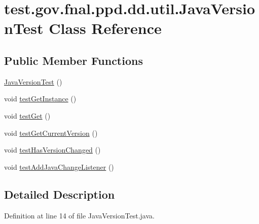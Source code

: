 \hypertarget{classtest_1_1gov_1_1fnal_1_1ppd_1_1dd_1_1util_1_1JavaVersionTest}{\section{test.\-gov.\-fnal.\-ppd.\-dd.\-util.\-Java\-Version\-Test Class Reference}
\label{classtest_1_1gov_1_1fnal_1_1ppd_1_1dd_1_1util_1_1JavaVersionTest}
}
\subsection*{Public Member Functions}
\begin{DoxyCompactItemize}
\item 
\hyperlink{classtest_1_1gov_1_1fnal_1_1ppd_1_1dd_1_1util_1_1JavaVersionTest_a9d05d91aac55a46245c15fa48672a740}{Java\-Version\-Test} ()
\item 
void \hyperlink{classtest_1_1gov_1_1fnal_1_1ppd_1_1dd_1_1util_1_1JavaVersionTest_a26ff2a21a2ccdeb1ec8d831fd679487f}{test\-Get\-Instance} ()
\item 
void \hyperlink{classtest_1_1gov_1_1fnal_1_1ppd_1_1dd_1_1util_1_1JavaVersionTest_a2827e884cee62781c717ed06d9fe869e}{test\-Get} ()
\item 
void \hyperlink{classtest_1_1gov_1_1fnal_1_1ppd_1_1dd_1_1util_1_1JavaVersionTest_ac6b4218413e228de9a47a4643894678e}{test\-Get\-Current\-Version} ()
\item 
void \hyperlink{classtest_1_1gov_1_1fnal_1_1ppd_1_1dd_1_1util_1_1JavaVersionTest_aa2efba73d36ed6d93bbe8915c4838932}{test\-Has\-Version\-Changed} ()
\item 
void \hyperlink{classtest_1_1gov_1_1fnal_1_1ppd_1_1dd_1_1util_1_1JavaVersionTest_aae93ddb32a8d9cd0b00194dd5d7597e5}{test\-Add\-Java\-Change\-Listener} ()
\end{DoxyCompactItemize}


\subsection{Detailed Description}


Definition at line 14 of file Java\-Version\-Test.\-java.



